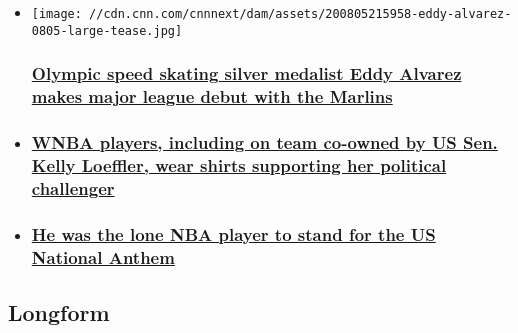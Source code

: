\begin{itemize}
\item
  \href{/2020/08/05/sport/eddy-alvarez-major-league-debut-spt-intl/index.html}{}

  \texttt{[image: //cdn.cnn.com/cnnnext/dam/assets/200805215958-eddy-alvarez-0805-large-tease.jpg]}

  \hypertarget{olympic-speed-skating-silver-medalist-eddy-alvarez-makes-major-league-debut-with-the-marlins}{%
  \subsubsection{\texorpdfstring{\href{/2020/08/05/sport/eddy-alvarez-major-league-debut-spt-intl/index.html}{Olympic
  speed skating silver medalist Eddy Alvarez makes major league debut
  with the
  Marlins}}{Olympic speed skating silver medalist Eddy Alvarez makes major league debut with the Marlins}}\label{olympic-speed-skating-silver-medalist-eddy-alvarez-makes-major-league-debut-with-the-marlins}}
\item
  \hypertarget{wnba-players-including-on-team-co-owned-by-us-sen-kelly-loeffler-wear-shirts-supporting-her-political-challenger}{%
  \subsubsection{\texorpdfstring{\href{/2020/08/04/politics/wnba-shirts-loeffler-vote-warnock/index.html}{WNBA
  players, including on team co-owned by US Sen. Kelly Loeffler, wear
  shirts supporting her political
  challenger}}{WNBA players, including on team co-owned by US Sen. Kelly Loeffler, wear shirts supporting her political challenger}}\label{wnba-players-including-on-team-co-owned-by-us-sen-kelly-loeffler-wear-shirts-supporting-her-political-challenger}}
\item
  \hypertarget{he-was-the-lone-nba-player-to-stand-for-the-us-national-anthem}{%
  \subsubsection{\texorpdfstring{\href{/2020/07/31/us/nba-magic-national-anthem-trnd/index.html}{He
  was the lone NBA player to stand for the US National
  Anthem}}{He was the lone NBA player to stand for the US National Anthem}}\label{he-was-the-lone-nba-player-to-stand-for-the-us-national-anthem}}
\end{itemize}

\hypertarget{longform-}{%
\subsection{Longform~}\label{longform-}}

